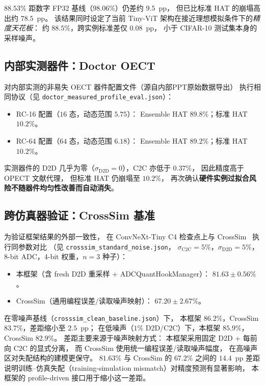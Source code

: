 $88.53\%$ 距数字 FP32 基线（$98.06\%$）仍差约 $9.5$~pp，
但已比标准 HAT 的崩塌高出约 $78.5$~pp。
该结果同时设定了当前 Tiny-ViT 架构在接近理想模拟条件下的\emph{精度天花板}：
约 $88.5\%$，跨实例标准差仅 $0.08$~pp，
小于 CIFAR-10 测试集本身的采样噪声。

\subsection{内部实测器件：Doctor OECT}

对内部实测的非易失 OECT 器件配置文件（源自内部PPT原始数据导出）
执行相同协议（见 \texttt{doctor\_measured\_profile\_eval.json}）：
\begin{itemize}
    \item RC-16 配置（$16$ 态，动态范围 $5.75$）：
    Ensemble HAT $89.8\%$；标准 HAT $10.2\%$。
    \item RC-64 配置（$64$ 态，动态范围 $6.18$）：
    Ensemble HAT $89.2\%$；标准 HAT $10.2\%$。
\end{itemize}

实测器件的 D2D 几乎为零（$\sigma_{\mathrm{D2D}}=0$），C2C 亦低于 $0.37\%$，
因此精度高于 OPECT 文献代理，
但标准 HAT 仍崩塌至 $10.2\%$，
再次确认\textbf{硬件实例过拟合风险不随器件均匀性改善而自动消失}。

\subsection{跨仿真器验证：CrossSim 基准}

为验证框架结果的外部一致性，
在 ConvNeXt-Tiny C4 检查点上与 CrossSim~\parencite{crosssim2026} 执行同参数对比
（见 \texttt{crosssim\_standard\_noise.json}，
$\sigma_{\mathrm{C2C}}=5\%$，$\sigma_{\mathrm{D2D}}=5\%$，8-bit ADC，4-bit 权重，$n=3$ 种子）：
\begin{itemize}
    \item 本框架（含 fresh D2D 重采样 + ADCQuantHookManager）：
    $\mathbf{81.63\pm0.56\%}$。
    \item CrossSim（通用编程误差/读取噪声映射）：
    $67.20\pm2.67\%$。
\end{itemize}

在零噪声基线（\texttt{crosssim\_clean\_baseline.json}）下，
本框架 $86.2\%$，CrossSim $83.7\%$，差距缩小至 $2.5$~pp；
在低噪声（$1\%$ D2D/C2C）下，本框架 $85.9\%$，CrossSim $82.9\%$。
差距主要来源于噪声映射方式：
本框架采用固定 D2D + 每前向 C2C 的显式分离，
而 CrossSim 使用统一编程误差/读取噪声幅度，
在高噪声区对失配结构的建模更保守。
$81.63\%$ 与 CrossSim 的 $67.2\%$ 之间的 $14.4$~pp 差距
说明训练--仿真失配（training-simulation mismatch）对精度预测有显著影响，
本框架的 profile-driven 接口用于缩小这一差距。


